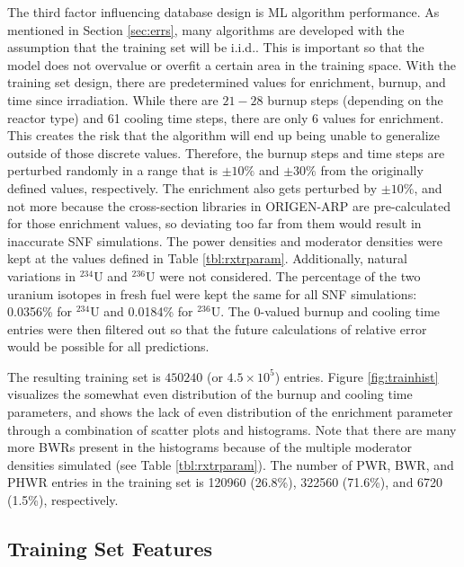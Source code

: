The third factor influencing database design is \gls{ML} algorithm performance.
As mentioned in Section \ref{sec:errs}, many algorithms are developed with the
assumption that the training set will be \acrfull{i.i.d.}.  This is important
so that the model does not overvalue or overfit a certain area in the training
space. With the training set design, there are predetermined values for
enrichment, burnup, and time since irradiation.  While there are $21-28$ burnup
steps  (depending on the reactor type) and 61 cooling
time steps, there are only 6 values for enrichment. This creates the risk that
the algorithm will end up being unable to generalize outside of those discrete
values. Therefore, the burnup steps and time steps are perturbed randomly in a
range that is $\pm10\%$ and $\pm30\%$ from the originally defined values,
respectively.  The enrichment also gets perturbed by $\pm10\%$, and not more
because the cross-section libraries in \gls{ORIGEN-ARP} are pre-calculated for
those enrichment values, so deviating too far from them would result in
inaccurate \gls{SNF} simulations. The power densities and moderator densities
were kept at the values defined in Table \ref{tbl:rxtrparam}.  Additionally,
natural variations in ${}^{234}\text{U}$ and ${}^{236}\text{U}$ were not
considered.  The percentage of the two uranium isotopes in fresh fuel were kept
the same for all \gls{SNF} simulations: 0.0356\% for ${}^{234}\text{U}$ and
0.0184\% for ${}^{236}\text{U}$.  The 0-valued burnup and cooling time entries
were then filtered out so that the future calculations of relative error would
be possible for all predictions.  

The resulting training set is $450240$ (or $4.5 \times 10^5$) entries.  Figure
\ref{fig:trainhist} visualizes the somewhat even distribution of the burnup and
cooling time parameters, and shows the lack of even distribution of the
enrichment parameter through a combination of scatter plots and histograms.
Note that there are many more \gls{BWR}s present in the histograms because of
the multiple moderator densities simulated (see Table \ref{tbl:rxtrparam}). The
number of \gls{PWR}, \gls{BWR}, and \gls{PHWR} entries in the training set is
120960 (26.8\%), 322560 (71.6\%), and 6720 (1.5\%), respectively.

\subsection{Training Set Features}
\label{sec:snffeats}

